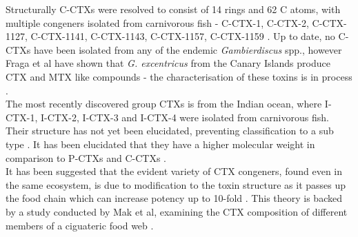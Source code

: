 \documentclass[12pt]{article}
\begin{document}
Structurally C-CTXs were resolved to consist of 14 rings and 62 C atoms, with multiple congeners isolated from carnivorous fish - C-CTX-1, C-CTX-2, C-CTX-1127, C-CTX-1141, C-CTX-1143, C-CTX-1157, C-CTX-1159 \cite{vernoux1997isolation,lewis1998structure,pottier2003identification,pottier2002characterisation}. Up to date, no C-CTXs have been isolated from any of the endemic \emph{Gambierdiscus} spp., however Fraga et al have shown that \emph{G. excentricus} from the Canary Islands produce CTX and MTX like compounds - the characterisation of these toxins is in process \cite{fraga2011gambierdiscus}. \\
The most recently discovered group CTXs is from the Indian ocean, where I-CTX-1, I-CTX-2, I-CTX-3 and I-CTX-4 were isolated from carnivorous fish. Their structure has not yet been elucidated, preventing classification to a sub type \cite{hamilton2002multiple,hamilton2002isolation}. It has been elucidated that they have a higher molecular weight in comparison to P-CTXs and C-CTXs \cite{caillaud2010update,hamilton2002multiple,hamilton2002isolation}. \\ %

It has been suggested that the evident variety of CTX congeners, found even in the same ecosystem, is due to modification to the toxin structure as it passes up the food chain which can increase potency up to 10-fold \cite{hokama1996human,lewis2006ciguatera}. This theory is backed by a study conducted by Mak et al, examining the CTX composition of different members of a ciguateric food web \cite{mak2013pacific}.

\end{document}
